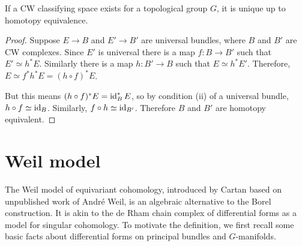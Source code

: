 \begin{comment}
Let $X$ be a CW complex, and $[X,B]$ be the homotopy classes of maps $h:X\to B$, 
and  $\mathcal{P}_G(X)$ be the isomorphism classes of principal $G$-bundles over $X$. 
Then the definition of universal $G$-bundle states the map
$\varphi:[X,BG]\to\mathcal{P}_G(X)$ given by $h\mapsto h^*(EG)$ is surjective
(condition (i)) and injective (condition (ii)). 
\end{comment}

\begin{thm} %
	If a CW classifying space exists for a topological group $G$, it is unique 
	up to homotopy equivalence.
\end{thm}
\begin{proof}
	Suppose $E\to B$ and  $E'\to B'$ are universal bundles, where $B$ and  $B'$
	are CW complexes. Since  $E'$ is
	universal there is a map  $f:B\to B'$ such that  $E'\simeq h^*E$. Similarly
	there is a map  $h:B'\to B$ such that  $E\simeq h^*E'$. Therefore,  $E\simeq
	f^*h^*E=(h\circ f)^*E$. 

	But this means  $(h\circ f)^*E = \operatorname{id}_B^*E$, so by condition (ii) of a
	universal bundle, $h\circ f \simeq \operatorname{id}_B$. Similarly, $f\circ h\simeq
	\operatorname{id}_{B'}$. Therefore $B$ and  $B'$ are homotopy equivalent.
\end{proof}



\section{Weil model}
The Weil model of equivariant cohomology, introduced by Cartan based on
unpublished work of Andr\'e Weil, is an algebraic alternative to the
Borel construction. It is akin to the de Rham chain complex of
differential forms as a model for singular cohomology.  
To motivate the definition, we first recall some basic facts about differential
forms on principal bundles and $G$-manifolds. 


